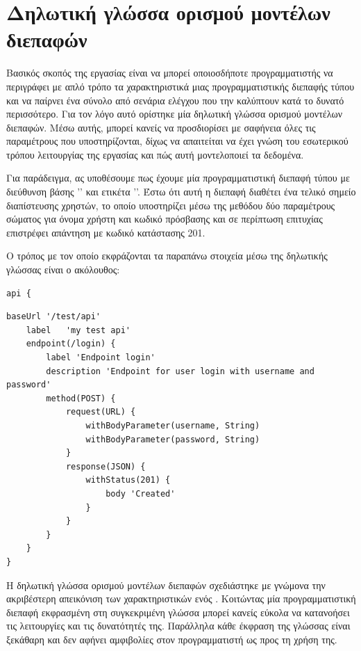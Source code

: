 \section{Δηλωτική γλώσσα ορισμού μοντέλων διεπαφών}

Βασικός σκοπός της εργασίας είναι να μπορεί οποιοσδήποτε προγραμματιστής να περιγράφει με απλό τρόπο
τα χαρακτηριστικά μιας προγραμματιστικής διεπαφής τύπου 
και να παίρνει ένα σύνολο από σενάρια ελέγχου που την καλύπτουν κατά το δυνατό περισσότερο.
Για τον λόγο αυτό ορίστηκε μία δηλωτική γλώσσα ορισμού μοντέλων διεπαφών.
Μέσω αυτής, μπορεί κανείς να προσδιορίσει με σαφήνεια όλες τις παραμέτρους που υποστηρίζονται,
δίχως να απαιτείται να έχει γνώση του εσωτερικού τρόπου λειτουργίας της εργασίας
και πώς αυτή μοντελοποιεί τα δεδομένα.

Για παράδειγμα,
ας υποθέσουμε πως έχουμε μία προγραμματιστική διεπαφή τύπου 
με διεύθυνση βάσης '\emph{}' και ετικέτα '\emph{}'.
Έστω ότι αυτή η διεπαφή διαθέτει ένα τελικό σημείο διαπίστευσης χρηστών,
το οποίο υποστηρίζει μέσω της μεθόδου  δύο παραμέτρους σώματος για όνομα χρήστη και κωδικό πρόσβασης
και σε περίπτωση επιτυχίας επιστρέφει απάντηση με κωδικό κατάστασης 201.

Ο τρόπος με τον οποίο εκφράζονται τα παραπάνω στοιχεία μέσω της δηλωτικής γλώσσας είναι ο ακόλουθος:

\begin{lstlisting}
api {
\end{lstlisting}
\begin{lstlisting}[deletekeywords={api}]
    baseUrl '/test/api'
    label   'my test api'
    endpoint(/login) {
        label 'Endpoint login'
        description 'Endpoint for user login with username and password'
        method(POST) {
            request(URL) {
                withBodyParameter(username, String)
                withBodyParameter(password, String)
            }
            response(JSON) {
                withStatus(201) {
                    body 'Created'
                }
            }
        }
    }
}
\end{lstlisting}

Η δηλωτική γλώσσα ορισμού μοντέλων διεπαφών σχεδιάστηκε με γνώμονα την ακριβέστερη απεικόνιση των χαρακτηριστικών ενός .
Κοιτώντας μία προγραμματιστική διεπαφή εκφρασμένη στη συγκεκριμένη γλώσσα 
μπορεί κανείς εύκολα να κατανοήσει τις λειτουργίες και τις δυνατότητές της.
Παράλληλα κάθε έκφραση της γλώσσας είναι ξεκάθαρη 
και δεν αφήνει αμφιβολίες στον προγραμματιστή ως προς τη χρήση της.

